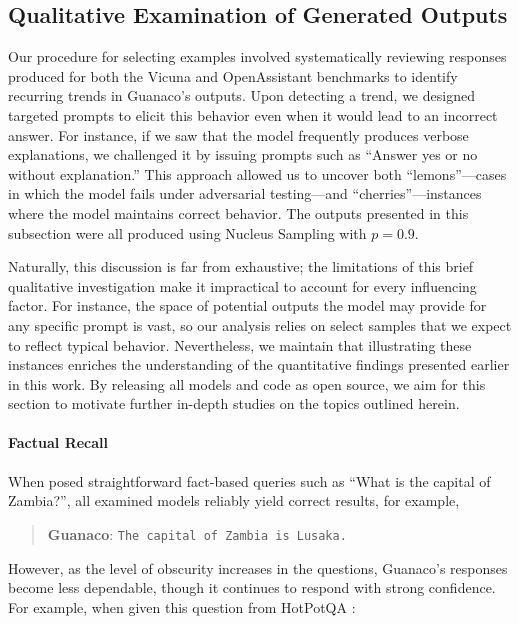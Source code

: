 \subsection{Qualitative Examination of Generated Outputs}
\label{ssec:examples}

Our procedure for selecting examples involved systematically reviewing responses produced for both the Vicuna and OpenAssistant benchmarks to identify recurring trends in {Guanaco}'s outputs. Upon detecting a trend, we designed targeted prompts to elicit this behavior even when it would lead to an incorrect answer. For instance, if we saw that the model frequently produces verbose explanations, we challenged it by issuing prompts such as ``Answer yes or no without explanation.'' This approach allowed us to uncover both ``lemons''—cases in which the model fails under adversarial testing—and ``cherries''—instances where the model maintains correct behavior. The outputs presented in this subsection were all produced using Nucleus Sampling \cite{holtzmancurious} with $p=0.9$.

Naturally, this discussion is far from exhaustive; the limitations of this brief qualitative investigation make it impractical to account for every influencing factor. For instance, the space of potential outputs the model may provide for any specific prompt is vast, so our analysis relies on select samples that we expect to reflect typical behavior. Nevertheless, we maintain that illustrating these instances enriches the understanding of the quantitative findings presented earlier in this work. By releasing all models and code as open source, we aim for this section to motivate further in-depth studies on the topics outlined herein.

\paragraph{Factual Recall} When posed straightforward fact-based queries such as ``What is the capital of Zambia?'', all examined models reliably yield correct results, for example,

\begin{quote} 
    \textbf{Guanaco}:
    \texttt{The capital of Zambia is Lusaka.}
\end{quote}

However, as the level of obscurity increases in the questions, {Guanaco}'s responses become less dependable, though it continues to respond with strong confidence. For example, when given this question from HotPotQA \citep{yang2018hotpotqa}:

